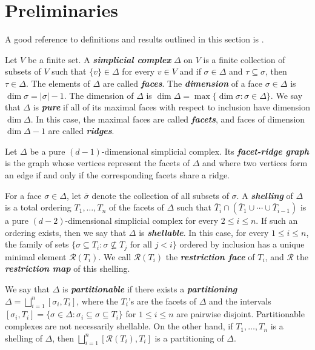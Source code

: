 \documentclass[11pt,twoside]{article}
\theoremstyle{definition}
\let\emptyset\varnothing
\newcommand{\cR}{\mathcal{R}}
\begin{document}
\section{Preliminaries}\label{sec:prelim}

A good reference to definitions and results outlined in this section is \cite[Chapter 8]{Ziegler}.

Let $V$ be a finite set. A \textbf{\emph{simplicial complex}} $\Delta$ on $V$ is a finite collection of subsets of $V$ such that $\{v\} \in \Delta$ for every $v \in V$ and if $\sigma \in \Delta$ and $\tau \subseteq \sigma$, then $\tau \in \Delta$. The elements of $\Delta$ are called \textbf{\emph{faces}}. The \textbf{\emph{dimension}} of a face $\sigma \in \Delta$ is $\dim \sigma = |\sigma| - 1$. 
The dimension of $\Delta$ is $\dim \Delta = \max \{\dim \sigma : \sigma \in \Delta\}$. We say that $\Delta$ is \textbf{\emph{pure}} if all of its maximal faces with respect to inclusion have dimension $\dim \Delta$. In this case, the maximal faces are called \textbf{\emph{facets}}, and faces of dimension $\dim \Delta - 1$ are called \textbf{\emph{ridges}}. 

Let $\Delta$ be a pure $(d-1)$-dimensional simplicial complex. Its \textbf{\emph{facet-ridge graph}} is the graph whose vertices represent the facets of $\Delta$ and where two vertices form an edge if and only if the corresponding facets share a ridge.

For a face $\sigma \in \Delta$, let $\overline{\sigma}$ denote the collection of all subsets of $\sigma$. A \textbf{\emph{shelling}} of $\Delta$ is a total ordering $T_1, \dots, T_n$ of the facets of $\Delta$ such that $\overline{T}_i \cap (\overline{T}_1 \cup \cdots \cup \overline{T}_{i-1})$ is a pure $(d-2)$-dimensional simplicial complex for every $2 \le i \le n$. If such an ordering exists, then we say that $\Delta$ is \textbf{\emph{shellable}}. In this case, for every $1 \le i \le n$, the family of sets $\{\sigma \subseteq T_i: \sigma \nsubseteq T_j \text{ for all } j < i\}$ ordered by inclusion has a unique minimal element $\cR(T_i)$. We call $\cR(T_i)$ the \textbf{\emph{restriction face}} of $T_i$, and $\cR$ the \textbf{\emph{restriction map}} of this shelling. 


We say that $\Delta$ is \textbf{\emph{partitionable}} if there exists a \textbf{\emph{partitioning}} $\Delta = \bigsqcup_{i = 1}^n [\sigma_i, T_i]$, where the $T_i$'s are the facets of $\Delta$ and the intervals $[\sigma_i, T_i] = \{\sigma \in \Delta: \sigma_i \subseteq \sigma \subseteq T_i\}$ for $1\le i\le n$ are pairwise disjoint. Partitionable complexes are not necessarily shellable. On the other hand, if $T_1, \dots, T_n$ is a shelling of $\Delta$, then $\bigsqcup_{i = 1}^n [\cR(T_i), T_i]$ is a partitioning of $\Delta$.
\end{document}

